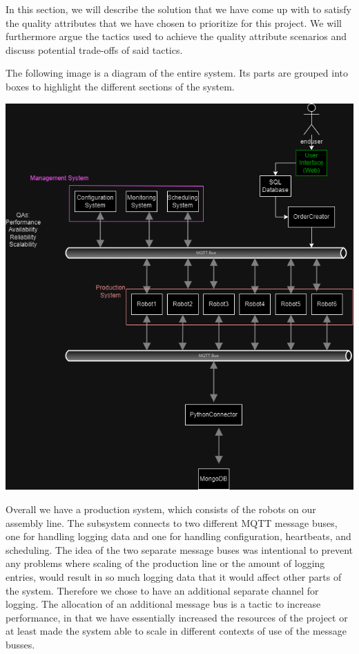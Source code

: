 
In this section, we will describe the solution that we have come up with to satisfy the quality attributes that we have chosen to prioritize for this project. We will furthermore argue the tactics used to achieve the quality attribute scenarios and discuss potential trade-offs of said tactics.

The following image is a diagram of the entire system. Its parts are grouped into boxes to highlight the different sections of the system.
\begin{center}
    \includegraphics[scale=0.38]{Images/Systemdiagram.drawio.png}
\end{center}
\vspace{1em}

Overall we have a production system, which consists of the robots on our assembly line.
The subsystem connects to two different MQTT message buses, one for handling logging data and one for handling configuration, heartbeats, and scheduling. The idea of the two separate message buses was intentional to prevent any problems where scaling of the production line or the amount of logging entries, would result in so much logging data that it would affect other parts of the system. Therefore we chose to have an additional separate channel for logging. The allocation of an additional message bus is a tactic to increase performance, in that we have essentially increased the resources of the project or at least made the system able to scale in different contexts of use of the message busses.


